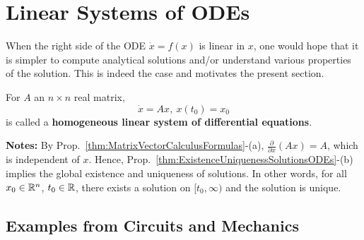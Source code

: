 \section{Linear Systems of ODEs}


When the right side of the ODE $\dot{x} = f(x)$ is linear in $x$, one would hope that it is simpler to compute analytical solutions and/or understand various properties of the solution. This is indeed the case and motivates the present section.

\bigskip

\begin{tcolorbox}[colback=mylightblue, title = {\bf Homogeneous Linear Systems}, breakable]

\begin{definition}
For $A$ an $n \times n$ real matrix, 
\begin{equation}
    \label{eq:HomogeneousLinearSystem}
  \dot{x} = A x, ~x(t_0) = x_0
\end{equation}
is called a \textbf{homogeneous linear system of differential equations}.
\end{definition}
\bigskip
\textbf{Notes:} By Prop.~\ref{thm:MatrixVectorCalculusFormulas}-(a), $\frac{\partial}{\partial x} \left( Ax \right) = A$, which is independent of $x$. Hence, Prop.~\ref{thm:ExistenceUniquenessSolutionsODEs}-(b) implies the global existence and uniqueness of solutions. In other words, for all $x_0\in \mathbb R^n$, $t_0\in \mathbb R$, there exists a solution on $[t_0, \infty)$ and the solution is unique.  
\end{tcolorbox}

\subsection{Examples from Circuits and Mechanics}

\bigskip

